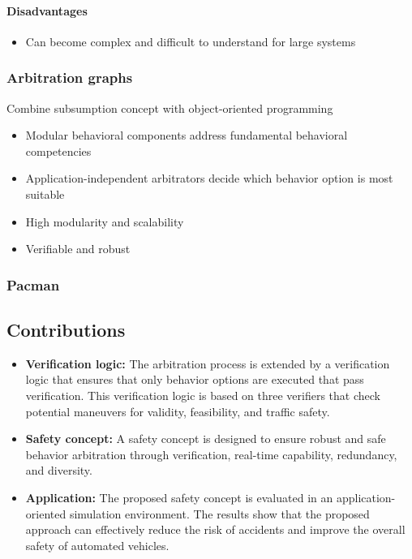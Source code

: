 \paragraph*{Disadvantages}
\begin{itemize}
    \item Can become complex and difficult to understand for large systems
\end{itemize}

\subsubsection*{Arbitration graphs}
Combine subsumption concept with object-oriented programming \cite{lauer_cognitive_2010}
\begin{itemize}
    \item Modular behavioral components address fundamental behavioral competencies
    \item Application-independent arbitrators decide which behavior option is most suitable
    \item High modularity and scalability
    \item Verifiable and robust
\end{itemize}

\subsubsection*{Pacman}

\subsection{Contributions}

\begin{itemize}
    \item \textbf{Verification logic:} The arbitration process is extended by a verification logic that ensures that only behavior options are executed that pass verification. This verification logic is based on three verifiers that check potential maneuvers for validity, feasibility, and traffic safety.
    \item \textbf{Safety concept:} A safety concept is designed to ensure robust and safe behavior arbitration through verification, real-time capability, redundancy, and diversity.
    \item \textbf{Application:} The proposed safety concept is evaluated in an application-oriented simulation environment. The results show that the proposed approach can effectively reduce the risk of accidents and improve the overall safety of automated vehicles.
\end{itemize}
